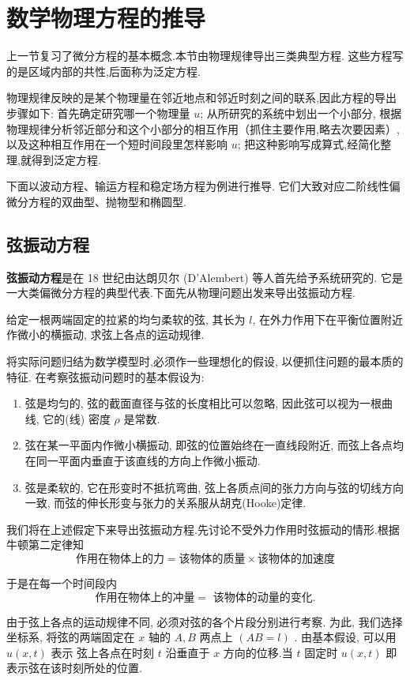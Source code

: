 \section{数学物理方程的推导}

上一节复习了微分方程的基本概念.本节由物理规律导出三类典型方程.
这些方程写的是区域内部的共性,后面称为泛定方程.

物理规律反映的是某个物理量在邻近地点和邻近时刻之间的联系,因此方程的导出步骤如下:
首先确定研究哪一个物理量 $u$;
从所研究的系统中划出一个小部分,
根据物理规律分析邻近部分和这个小部分的相互作用（抓住主要作用,略去次要因素）,
以及这种相互作用在一个短时间段里怎样影响 $u$;
把这种影响写成算式,经简化整理,就得到泛定方程.

下面以波动方程、输运方程和稳定场方程为例进行推导.
它们大致对应二阶线性偏微分方程的双曲型、抛物型和椭圆型.

\subsection{弦振动方程}
\textbf{弦振动方程}是在 18 世纪由达朗贝尔 (D'Alembert) 等人首先给予系统研究的.
它是一大类偏微分方程的典型代表.下面先从物理问题出发来导出弦振动方程.

给定一根两端固定的拉紧的均匀柔软的弦, 其长为 $l$, 在外力作用下在平衡位置附近作微小的横振动, 
求弦上各点的运动规律.

将实际问题归结为数学模型时,必须作一些理想化的假设, 以便抓住问题的最本质的特征.
在考察弦振动问题时的基本假设为:
\begin{enumerate}
    \item  弦是均匀的, 弦的截面直径与弦的长度相比可以忽略, 因此弦可以视为一根曲线, 
        它的(线) 密度 $\rho$ 是常数.
    \item 弦在某一平面内作微小横振动, 即弦的位置始终在一直线段附近, 
        而弦上各点均在同一平面内垂直于该直线的方向上作微小振动.
    \item  弦是柔软的, 它在形变时不抵抗弯曲, 弦上各质点间的张力方向与弦的切线方向一致,
        而弦的伸长形变与张力的关系服从胡克(Hooke)定律.
\end{enumerate}

我们将在上述假定下来导出弦振动方程.先讨论不受外力作用时弦振动的情形.根据牛顿第二定律知
$$
\text{作用在物体上的力} = \text{该物体的质量} \times \text{该物体的加速度}
$$

于是在每一个时间段内
$$
\text{作用在物体上的冲量} = \text{ 该物体的动量的变化}.
$$

由于弦上各点的运动规律不同, 必须对弦的各个片段分别进行考察.
为此, 我们选择坐标系, 将弦的两端固定在 $x$ 轴的 $A,B$ 两点上 $(AB=l)$ .
由基本假设, 可以用 $u(x, t)$ 表示
弦上各点在时刻 $t$ 沿垂直于 $x$ 方向的位移.当 $t$ 固定时 $u(x, t)$ 即表示弦在该时刻所处的位置.


